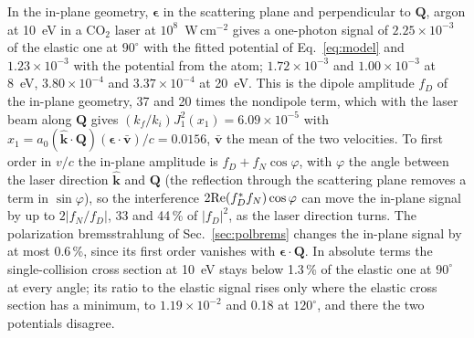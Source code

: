 \documentclass[11pt]{article}
\numberwithin{equation}{section}
\begin{document}
In the in-plane geometry, $\boldsymbol\epsilon$ in the scattering plane and perpendicular to
$\mathbf Q$, argon at 10~eV in a CO$_2$ laser at $10^8$~W\,cm$^{-2}$ gives a one-photon signal of
$2.25\times10^{-3}$ of the elastic one at $90^\circ$ with the fitted potential of Eq.~\eqref{eq:model} and
$1.23\times10^{-3}$ with the potential from the atom; $1.72\times10^{-3}$ and $1.00\times10^{-3}$ at 8~eV,
$3.80\times10^{-4}$ and $3.37\times10^{-4}$ at 20~eV. This is the dipole amplitude $f_D$ of the in-plane
geometry, 37 and 20 times the nondipole term, which with the laser beam along $\mathbf Q$ gives
$(k_f/k_i)J_1^2(x_1)=6.09\times10^{-5}$ with $x_1=a_0(\hat{\mathbf k}\cdot\mathbf Q)(\boldsymbol\epsilon\cdot\bar{\mathbf v})/c=0.0156$,
$\bar{\mathbf v}$ the mean of the two velocities. To first order in $v/c$ the in-plane amplitude is
$f_D+f_N\cos\varphi$, with $\varphi$ the angle between the laser direction $\hat{\mathbf k}$ and $\mathbf Q$ (the
reflection through the scattering plane removes a term in $\sin\varphi$), so the interference
$2{\rm Re}(f_D^*f_N)\cos\varphi$ can move the in-plane signal by up to $2|f_N/f_D|$, 33 and 44\,\% of
$|f_D|^2$, as the laser direction turns. The polarization bremsstrahlung of
Sec.~\ref{sec:polbrems} changes the in-plane signal by at most 0.6\,\%, since its first order vanishes with
$\boldsymbol\epsilon\cdot\mathbf Q$. In absolute terms the single-collision cross section at 10~eV stays
below 1.3\,\% of the elastic one at $90^\circ$ at every angle; its ratio to the elastic signal rises only
where the elastic cross section has a minimum, to $1.19\times10^{-2}$ and 0.18 at $120^\circ$, and
there the two potentials disagree.
\end{document}
